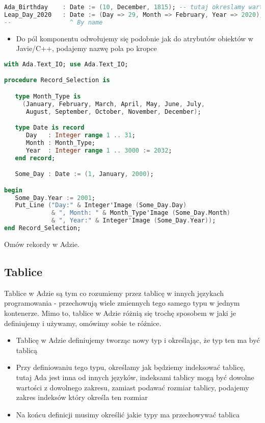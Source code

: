\documentclass[a4paper,15pt]{article}
\newcommand{\ask}[2]{
    \begin{tcolorbox}[colback=black!5!white,colframe=gray,title={Pytanie #1}]
        #2
    \end{tcolorbox}
}
\begin{document}
\begin{lstlisting}[language=Ada, caption=Przyklady agregatow dla typu Date]
Ada_Birthday    : Date := (10, December, 1815); -- tutaj okreslamy wartosci przez pozycje pola
Leap_Day_2020   : Date := (Day => 29, Month => February, Year => 2020); -- tutaj okreslamy wartosci podajac nazwe pola
--                ^ By name
\end{lstlisting}

\begin{itemize}
\item Do pól komponentu odwołujemy się podobnie jak do atrybutów obiektów w Javie/C++, podajemy nazwę pola po kropce
\end{itemize}

\begin{lstlisting}[language=Ada, caption=Stosowanie rekordow]
with Ada.Text_IO; use Ada.Text_IO;

procedure Record_Selection is

   type Month_Type is
     (January, February, March, April, May, June, July,
      August, September, October, November, December);

   type Date is record
      Day   : Integer range 1 .. 31;
      Month : Month_Type;
      Year  : Integer range 1 .. 3000 := 2032;
   end record;

   Some_Day : Date := (1, January, 2000);

begin
   Some_Day.Year := 2001;
   Put_Line ("Day:" & Integer'Image (Some_Day.Day)
             & ", Month: " & Month_Type'Image (Some_Day.Month)
             & ", Year:" & Integer'Image (Some_Day.Year));
end Record_Selection;
\end{lstlisting}

\ask{}{
Omów rekordy w Adzie.
}


\subsection{Tablice}

Tablice w Adzie są tym co rozumiemy przez tablicę w innych językach programowania - przechowują wiele zmiennych tego samego typu w jednym kontenerze. Mimo to, tablice w Adzie różnią się trochę sposobem w jaki je definiujemy i używamy, omówimy sobie te różnice.

\begin{itemize}
\item Tablicę w Adzie definiujemy tworząc nowy typ i określając, że typ ten ma być tablicą
\item Przy definiowaniu tego typu, określamy jak będziemy indeksować tablicę, tutaj Ada jest inna od innych języków, indeksami tablicy mogą być dowolne wartości z dowolnego zakresu, zamiast podawać rozmiar tablicy, podajemy zakres indeksów który określa ten rozmiar
\item Na końcu definicji musimy określić jakie typy ma przechowywać tablica
\end{itemize}
\end{document}
